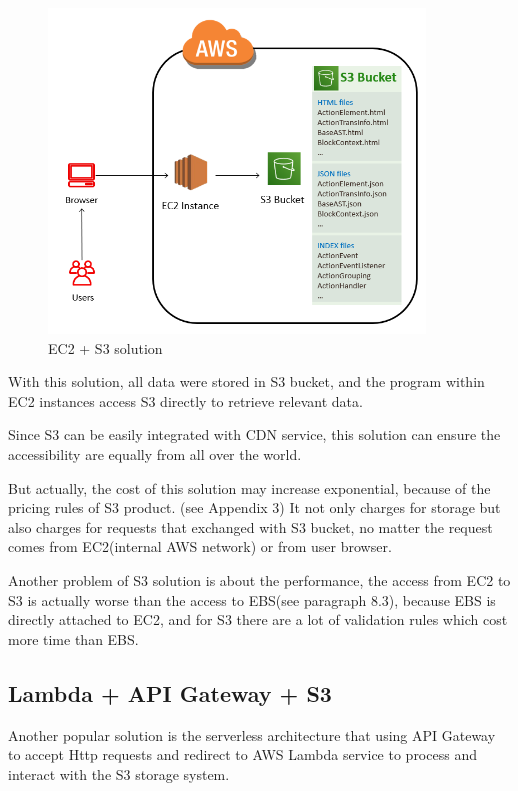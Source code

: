 \documentclass[runningheads]{llncs}
\begin{document}
\begin{figure}[H]
	\centering
	\includegraphics[width=10cm]{pic/ec2-s3.png}
	\caption{EC2 + S3 solution}
	\label{EC2 + S3 solution}
\end{figure}

With this solution, all data were stored in S3 bucket, and the program within EC2 instances access S3 directly to retrieve relevant data. 

Since S3 can be easily integrated with CDN service, this solution can ensure the accessibility are equally from all over the world. 

But actually, the cost of this solution may increase exponential, because of the pricing rules of S3 product. (see Appendix 3) It not only charges for storage but also charges for requests that exchanged with S3 bucket, no matter the request comes from EC2(internal AWS network) or from user browser.

Another problem of S3 solution is about the performance, the access from EC2 to S3 is actually worse than the access to EBS(see paragraph 8.3), because EBS is directly attached to EC2, and for S3 there are a lot of validation rules which cost more time than EBS.

\subsection{Lambda + API Gateway + S3}
Another popular solution is the serverless architecture that using API Gateway\cite{api-gateway} to accept Http requests and redirect to AWS Lambda\cite{lambda} service to process and interact with the S3 storage system.
\end{document}
